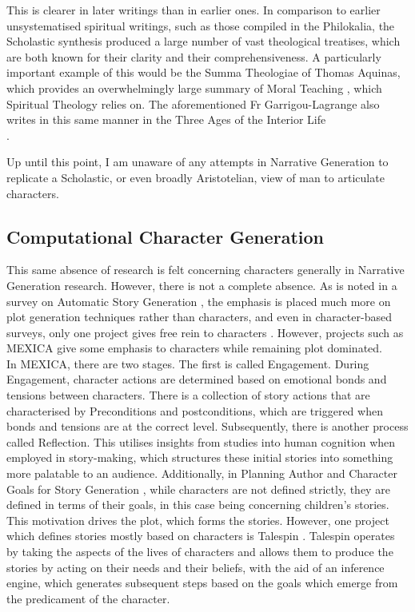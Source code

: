 \documentclass[12pt]{article}
\begin{document}
This is clearer in later writings than in earlier ones. In comparison to earlier unsystematised spiritual writings, such as those compiled in the Philokalia\cite{1983philokalia}, the Scholastic synthesis produced a large number of vast theological treatises, which are both known for their clarity and their comprehensiveness. A particularly important example of this would be the Summa Theologiae of Thomas Aquinas, which provides an overwhelmingly large summary of Moral Teaching \cite{aquinas2014summa}, which Spiritual Theology relies on. The aforementioned Fr Garrigou-Lagrange also writes in this same manner in the Three Ages of the Interior Life\\.

Up until this point, I am unaware of any attempts in Narrative Generation to replicate a Scholastic, or even broadly Aristotelian, view of man to articulate characters.\\
\subsection{Computational Character Generation}
This same absence of research is felt concerning characters generally in Narrative Generation research. However, there is not a complete absence. As is noted in a survey on Automatic Story Generation \cite{AutomaticStoryGeneration2021}, the emphasis is placed much more on plot generation techniques rather than characters, and even in character-based surveys, only one project gives free rein to characters \cite{Riedl2003CharacterfocusedNP}. However, projects such as MEXICA\cite{MEXICA} give some emphasis to characters while remaining plot dominated.\\

In MEXICA, there are two stages. The first is called Engagement. During Engagement, character actions are determined based on emotional bonds and tensions between characters. There is a collection of story actions that are characterised by Preconditions and postconditions, which are triggered when bonds and tensions are at the correct level. Subsequently, there is another process called Reflection. This utilises insights from studies into human cognition when employed in story-making, which structures these initial stories into something more palatable to an audience. Additionally, in Planning Author and Character Goals for Story Generation \cite{authorandcharactergoals}, while characters are not defined strictly, they are defined in terms of their goals, in this case being concerning children's stories. This motivation drives the plot, which forms the stories. However, one project which defines stories mostly based on characters is Talespin \cite{Meehan1977TALESPINAI}. Talespin operates by taking the aspects of the lives of characters and allows them to produce the stories by acting on their needs and their beliefs, with the aid of an inference engine, which generates subsequent steps based on the goals which emerge from the predicament of the character.  \\  
\end{document}
